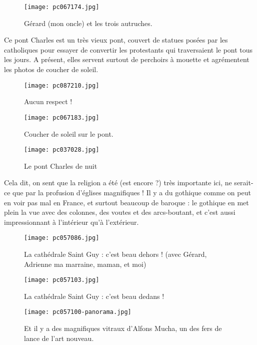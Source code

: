\documentclass{book}
\begin{document}
\begin{figure}[h]
\centering
\texttt{[image: pc067174.jpg]}
\caption*{Gérard (mon oncle) et les trois autruches.}
\end{figure}

Ce pont Charles est un très vieux pont, couvert de statues posées par les catholiques pour essayer de convertir les protestants qui traversaient le pont tous les jours. A présent, elles servent surtout de perchoirs à mouette et agrémentent les photos de coucher de soleil.




\begin{figure}[h]
\centering
\texttt{[image: pc087210.jpg]}
\caption*{Aucun respect !}
\end{figure}


\begin{figure}[h]
\centering
\texttt{[image: pc067183.jpg]}
\caption*{Coucher de soleil sur le pont.}
\end{figure}


\begin{figure}[h]
\centering
\texttt{[image: pc037028.jpg]}
\caption*{Le pont Charles de nuit}
\end{figure}

Cela dit, on sent que la religion a été (est encore ?) très importante ici, ne serait-ce que par la profusion d'églises magnifiques ! Il y a du gothique comme on peut en voir pas mal en France, et surtout beaucoup de baroque : le gothique en met plein la vue avec des colonnes, des voutes et des arcs-boutant, et c'est aussi impressionnant à l'intérieur qu'à l'extérieur.


\begin{figure}[h]
\centering
\texttt{[image: pc057086.jpg]}
\caption*{La cathédrale Saint Guy : c'est beau dehors ! (avec Gérard, Adrienne ma marraine, maman, et moi)}
\end{figure}


\begin{figure}[h]
\centering
\texttt{[image: pc057103.jpg]}
\caption*{La cathédrale Saint Guy : c'est beau dedans !}
\end{figure}


\begin{figure}[h]
\centering
\texttt{[image: pc057100-panorama.jpg]}
\caption*{Et il y a des magnifiques vitraux d'Alfons  Mucha, un des fers de lance de l'art nouveau.}
\end{figure}
\end{document}
